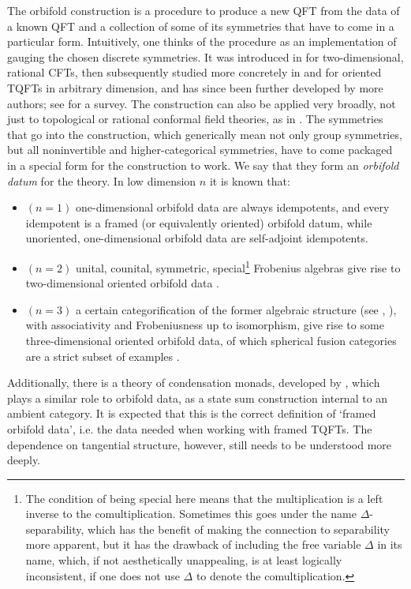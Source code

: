\documentclass[12pt,a4paper]{article}
\numberwithin{equation}{section}
\begin{document}
The orbifold construction is a procedure to produce a new QFT from the data of a known QFT and a collection of some of its symmetries that have to come in a particular form. Intuitively, one thinks of the procedure as an implementation of gauging the chosen discrete symmetries. It was introduced in \cite{ffrs} for two-dimensional, rational CFTs, then subsequently studied more concretely in \cite{orbifold2d} and \cite{orbifoldnd} for oriented TQFTs in arbitrary dimension, and has since been further developed by more authors; see \cite{orbifoldsurvey} for a survey. The construction can also be applied very broadly, not just to topological or rational conformal field theories, as in \cite[]{ising}. The symmetries that go into the construction, which generically mean not only group symmetries, but all noninvertible and higher-categorical symmetries, have to come packaged in a special form for the construction to work. We say that they form an \emph{orbifold datum} for the theory. In low dimension $n$ it is known that:
%
\begin{itemize}
    \item $(n=1)$ one-dimensional orbifold data are always idempotents, and every idempotent is a framed (or equivalently oriented) orbifold datum, while unoriented, one-dimensional orbifold data are self-adjoint idempotents.
    \item $(n=2)$ unital, counital, symmetric, special\footnote{The condition of being special here means that the multiplication is a left inverse to the comultiplication. Sometimes this goes under the name $\Delta$-separability, which has the benefit of making the connection to separability more apparent, but it has the drawback of including the free variable $\Delta$ in its name, which, if not aesthetically unappealing, is at least logically inconsistent, if one does not use $\Delta$ to denote the comultiplication.} Frobenius algebras give rise to two-dimen\-sional oriented orbifold data \cite{orbifold2d}.
    \item $(n=3)$ a certain categorification of the former algebraic structure (see \cite{orbifoldnd}, \cite{orbifold3d}), with associativity and Frobeniusness up to isomorphism, give rise to some three-dimen\-sional oriented orbifold data, of which spherical fusion categories are a strict subset of examples \cite{sphericalfusion}.
\end{itemize}
%
Additionally, there is a theory of condensation monads, developed by \cite{condensation}, which plays a similar role to orbifold data, as a state sum construction internal to an ambient category. It is expected that this is the correct definition of `framed orbifold data', i.e. the data needed when working with framed TQFTs. The dependence on tangential structure, however, still needs to be understood more deeply.
\end{document}
